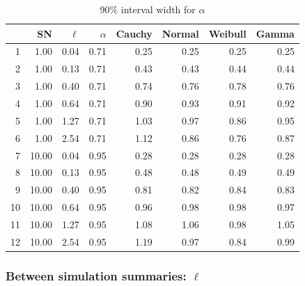\documentclass{article}
\begin{document}
\begin{table}[htbp]
\centering
\caption {90\% interval width for $\alpha$} \label{90_wid_alpha} 
\begin{tabular}{rrrrrrrr}
  \hline
 & SN & $\ell$ & $\alpha$ & Cauchy & Normal & Weibull & Gamma \\ 
  \hline
1 & 1.00 & 0.04 & 0.71 & 0.25 & 0.25 & 0.25 & 0.25 \\ 
  2 & 1.00 & 0.13 & 0.71 & 0.43 & 0.43 & 0.44 & 0.44 \\ 
  3 & 1.00 & 0.40 & 0.71 & 0.74 & 0.76 & 0.78 & 0.76 \\ 
  4 & 1.00 & 0.64 & 0.71 & 0.90 & 0.93 & 0.91 & 0.92 \\ 
  5 & 1.00 & 1.27 & 0.71 & 1.03 & 0.97 & 0.86 & 0.95 \\ 
  6 & 1.00 & 2.54 & 0.71 & 1.12 & 0.86 & 0.76 & 0.87 \\ 
  7 & 10.00 & 0.04 & 0.95 & 0.28 & 0.28 & 0.28 & 0.28 \\ 
  8 & 10.00 & 0.13 & 0.95 & 0.48 & 0.48 & 0.49 & 0.49 \\ 
  9 & 10.00 & 0.40 & 0.95 & 0.81 & 0.82 & 0.84 & 0.83 \\ 
  10 & 10.00 & 0.64 & 0.95 & 0.96 & 0.98 & 0.98 & 0.97 \\ 
  11 & 10.00 & 1.27 & 0.95 & 1.08 & 1.06 & 0.98 & 1.05 \\ 
  12 & 10.00 & 2.54 & 0.95 & 1.19 & 0.97 & 0.84 & 0.99 \\ 
   \hline
\end{tabular}
\end{table}

\subsubsection{Between simulation summaries: $\ell$}
\end{document}
